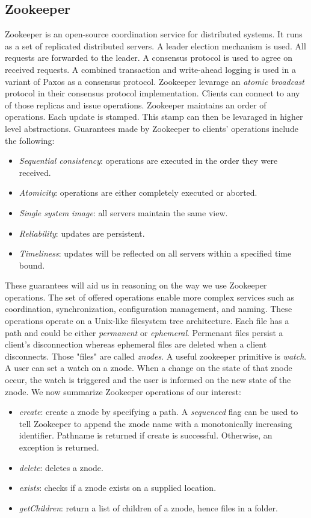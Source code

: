 \subsection{Zookeeper}
Zookeeper is an open-source coordination service for distributed systems. It runs as a set of replicated distributed servers. A leader election mechanism is used. All requests are forwarded to the leader. A consensus protocol is used to agree on received requests. A combined transaction and write-ahead logging is used in a variant of Paxos as a consensus protocol. Zookeeper levarage an \emph{atomic broadcast} protocol in their consensus protocol implementation. Clients can connect to any of those replicas and issue operations. Zookeeper maintains an order of operations. Each update is stamped. This stamp can then be levaraged in higher level abstractions. Guarantees made by Zookeeper to clients' operations include the following:
\begin{itemize}
\item{\emph{Sequential consistency}: operations are executed in the order they were received. }
\item{\emph{Atomicity}: operations are either completely executed or aborted. }
\item{\emph{Single system image}: all servers maintain the same view. }
\item{\emph{Reliability}: updates are persistent. }
\item{\emph{Timeliness}: updates will be reflected on all servers within a specified time bound. }
\end{itemize}
These guarantees will aid us in reasoning on the way we use Zookeeper operations. The set of offered operations enable more complex services such as coordination, synchronization, configuration management, and naming. These operations operate on a Unix-like filesystem tree architecture. Each file has a path and could be either \emph{permanent} or \emph{ephemeral}. Permenant files persist a client's disconnection whereas ephemeral files are deleted when a client disconnects. Those "files" are called \emph{znodes}. A useful zookeeper primitive is \emph{watch}. A user can set a watch on a znode. When a change on the state of that znode occur, the watch is triggered and the user is informed on the new state of the znode. We now summarize Zookeeper operations of our interest:
\begin{itemize}
\item{\emph{create}: create a znode by specifying a path. A \emph{sequenced} flag can be used to tell Zookeeper to append the znode name with a monotonically increasing identifier. Pathname is returned if create is successful. Otherwise, an exception is returned.}
\item{\emph{delete}: deletes a znode.}
\item{\emph{exists}: checks if a znode exists on a supplied location.}
\item{\emph{getChildren}: return a list of children of a znode, hence files in a folder.}
\end{itemize}
